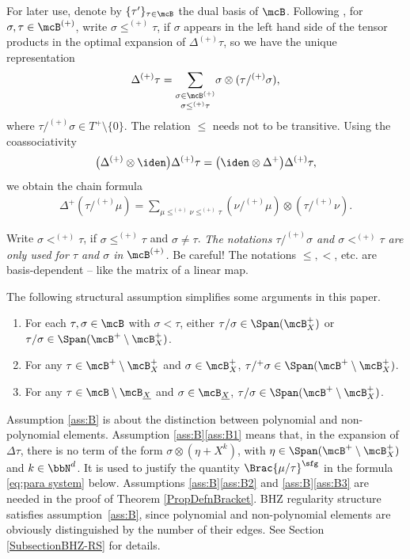 For later use, denote by $\{\tau'\}_{\tau\in\mcB}$ the dual basis of $\mcB$. Following \cite{BH}, for $\sigma,\tau\in\mcB^{(+)}$, write $\sigma\le^{(+)}\tau$, if $\sigma$ appears in the left hand side of the tensor products in the optimal expansion of $\Delta^{(+)}\tau$, so we have the unique representation
\[
\Delta^{(+)}\tau = \underset{\sigma\le^{(+)}\tau}{\sum_{\sigma\in\mcB^{(+)}}} \sigma\otimes(\tau/^{(+)}\sigma),
\]
where $\tau/^{(+)}\sigma\in T^+\setminus\{0\}$.
The relation $\le$ needs not to be transitive. Using the coassociativity
\[
\bigl(\Delta^{(+)}\otimes\iden \bigr)\Delta^{(+)}\tau = \bigl(\iden \otimes\Delta^+\bigr)\Delta^{(+)}\tau,
\]
we obtain the chain formula
\begin{align}\label{chain formula}
\Delta^{+}(\tau/^{(+)}\mu)=\sum_{\mu\le^{(+)}\nu\le^{(+)}\tau}(\nu/^{(+)}\mu)\otimes(\tau/^{(+)}\nu).
\end{align}

Write $\sigma<^{(+)}\tau$, if $\sigma\le^{(+)}\tau$ and $\sigma\neq\tau$.
{\it The notations $\tau/^{(+)}\sigma$ and $\sigma<^{(+)}\tau$ are only used for $\tau$ and $\sigma$ in $\mcB^{(+)}$.} Be careful! The notations $\leq, <$, etc. are basis-dependent -- like the matrix of a linear map.

The following structural assumption simplifies some arguments in this paper.

\skpt
\begin{assumption}\label{ass:B}
\begin{enumerate}
\item\label{ass:B1} For each $\tau,\sigma\in\mcB$ with $\sigma<\tau$, either $\tau/\sigma\in\Span (\mcB_X^+)$ or $\tau/\sigma\in\Span (\mcB^+\setminus\mcB_X^+)$.
\item\label{ass:B2} For any $\tau\in\mcB^+\setminus\mcB_X^+$ and $\sigma\in\mcB_X^+$, $\tau/^+\sigma\in\Span (\mcB^+\setminus\mcB_X^+)$.
\item\label{ass:B3} For any $\tau\in\mcB\setminus\mcB_{\underline{X}}$ and $\sigma\in\mcB_{\underline{X}}$, $\tau/\sigma\in\Span (\mcB^+\setminus\mcB_X^+)$.
\end{enumerate}
\end{assumption}

Assumption \eqref{ass:B} is about the distinction between polynomial and non-polynomial elements.
Assumption \ref{ass:B}\eqref{ass:B1} means that, in the expansion of $\Delta\tau$, there is no term of the form $\sigma\otimes (\eta+X^k)$, with $\eta\in\Span (\mcB^+\setminus\mcB_X^+)$ and $k\in\bbN^d$. It is used to justify the quantity $\Brac{\mu/\tau}^{\sfg}$ in the formula \eqref{eq:para system} below.
Assumptions \ref{ass:B}\eqref{ass:B2} and \ref{ass:B}\eqref{ass:B3} are needed in the proof of Theorem \ref{PropDefnBracket}.
BHZ regularity structure satisfies assumption~\eqref{ass:B}, since polynomial and non-polynomial elements are obviously distinguished by the number of their edges. See Section \ref{SubsectionBHZ-RS} for details.

